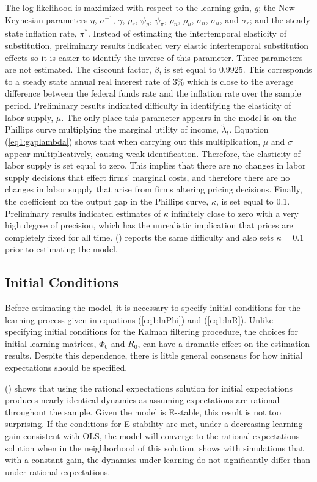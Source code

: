 \documentclass[11pt]{article}
\newcommand{\citee}[1]{\citeauthor*{#1} (\citeyear{#1})}
\begin{document}
The log-likelihood is maximized with respect to the learning gain, $g$; the New Keynesian parameters $\eta$, $\sigma^{-1}$, $\gamma$, $\rho_r$, $\psi_y$, $\psi_{\pi}$, $\rho_n$, $\rho_u$, $\sigma_n$, $\sigma_u$, and $\sigma_r$; and the steady state inflation rate, $\pi^*$.  Instead of estimating the intertemporal elasticity of substitution, preliminary results indicated very elastic intertemporal substitution effects so it is easier to identify the inverse of this parameter.  Three parameters are not estimated.  The discount factor, $\beta$, is set equal to $0.9925$.  This corresponds to a steady state annual real interest rate of 3\% which is close to the average difference between the federal funds rate and the inflation rate over the sample period.  Preliminary results indicated difficulty in identifying the elasticity of labor supply, $\mu$.  The only place this parameter appears in the model is on the Phillips curve multiplying the marginal utility of income, $\tilde{\lambda}_t$.  Equation (\ref{eq1:gaplambda}) shows that when carrying out this multiplication, $\mu$ and $\sigma$ appear multiplicatively, causing weak identification.  Therefore, the elasticity of labor supply is set equal to zero.  This implies that there are no changes in labor supply decisions that effect firms' marginal costs, and therefore there are no changes in labor supply that arise from firms altering pricing decisions.  Finally, the coefficient on the output gap in the Phillips curve, $\kappa$, is set equal to 0.1.  Preliminary results indicated estimates of $\kappa$ infinitely close to zero with a very high degree of precision, which has the unrealistic implication that prices are completely fixed for all time.  \citee{ireland_tech_2004} reports the same difficulty and also sets $\kappa=0.1$ prior to estimating the model.

\subsection{Initial Conditions}
Before estimating the model, it is necessary to specify initial conditions for the learning process given in equations (\ref{eq1:lnPhi}) and (\ref{eq1:lnR}).  Unlike specifying initial conditions for the Kalman filtering procedure, the choices for initial learning matrices, $\Phi_0$ and $R_{0}$, can have a dramatic effect on the estimation results.  Despite this dependence, there is little general consensus for how initial expectations should be specified.

\citee{williams2003} shows that using the rational expectations solution for initial expectations produces nearly identical dynamics as assuming expectations are rational throughout the sample.  Given the model is E-stable, this result is not too surprising.  If the conditions for E-stability are met, under a decreasing learning gain consistent with OLS, the model will converge to the rational expectations solution when in the neighborhood of this solution.  \citeauthor*{williams2003} shows with simulations that with a constant gain, the dynamics under learning do not significantly differ than under rational expectations.
\end{document}
